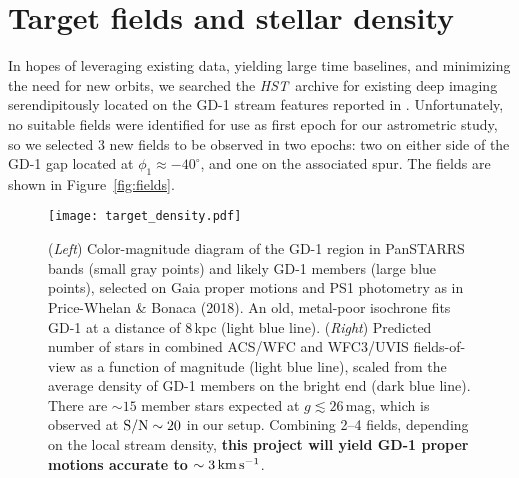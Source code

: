 \documentclass[12pt]{article}
\newcommand{\hst}{\textsl{HST}}
\begin{document}
\section*{Target fields and stellar density}
In hopes of leveraging existing data, yielding large time baselines, and minimizing the need for new orbits, we searched the \hst\ archive for existing deep imaging serendipitously located on the GD-1 stream features reported in \textcite{pwb2018}.
Unfortunately, no suitable fields were identified for use as first epoch for our astrometric study, so we selected 3 new fields to be observed in two epochs: two on either side of the GD-1 gap located at $\phi_1\approx-40^\circ$, and one on the associated spur.
The fields are shown in Figure~\ref{fig:fields}.

\begin{figure}
\begin{center}
\texttt{[image: target\_density.pdf]}
\end{center}
\caption{
(\emph{Left}) Color-magnitude diagram of the GD-1 region in PanSTARRS bands (small gray points) and likely GD-1 members (large blue points), selected on Gaia proper motions and PS1 photometry as in Price-Whelan \& Bonaca (2018).
An old, metal-poor isochrone fits GD-1 at a distance of 8\,kpc (light blue line).
(\emph{Right}) Predicted number of stars in combined ACS/WFC and WFC3/UVIS fields-of-view as a function of magnitude (light blue line), scaled from the average density of GD-1 members on the bright end (dark blue line).
There are $\sim15$ member stars expected at $g\lesssim26$\,mag, which is observed at $\rm S/N\sim20$ in our setup.
Combining 2--4 fields, depending on the local stream density, \textbf{this project will yield GD-1 proper motions accurate to $\sim3\,\rm km\,s^{-1}$}.
}
\label{fig:density}
\end{figure}
\end{document}
